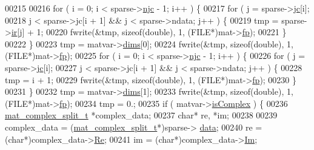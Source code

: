 \begin{DoxyCode}
{00215 
00216             \textcolor{keywordflow}{for} ( i = 0; i < sparse->\hyperlink{group___m_a_t_a482d8e4b40aa975f0c1daf146ebe08a4}{njc} - 1; i++ ) \{
00217                 \textcolor{keywordflow}{for} ( j = sparse->\hyperlink{group___m_a_t_ad1e74cdc4f7eff1e47a670297c01da4b}{jc}[i];
00218                       j < sparse->jc[i + 1] && j < sparse->ndata; j++ ) \{
00219                     tmp = sparse->\hyperlink{group___m_a_t_a8d4c863d704edddec5cbfa15b2d719c8}{ir}[j] + 1;
00220                     fwrite(&tmp, \textcolor{keyword}{sizeof}(\textcolor{keywordtype}{double}), 1, (FILE*)mat->\hyperlink{struct__mat__t_a85f562e407ca9ad4d2a6e14f839432b7}{fp});
00221                 \}
00222             \}
00223             tmp = matvar->\hyperlink{group___m_a_t_a8e01234e1c862ce3472bb37f5a09b92c}{dims}[0];
00224             fwrite(&tmp, \textcolor{keyword}{sizeof}(\textcolor{keywordtype}{double}), 1, (FILE*)mat->\hyperlink{struct__mat__t_a85f562e407ca9ad4d2a6e14f839432b7}{fp});
00225             \textcolor{keywordflow}{for} ( i = 0; i < sparse->\hyperlink{group___m_a_t_a482d8e4b40aa975f0c1daf146ebe08a4}{njc} - 1; i++ ) \{
00226                 \textcolor{keywordflow}{for} ( j = sparse->\hyperlink{group___m_a_t_ad1e74cdc4f7eff1e47a670297c01da4b}{jc}[i];
00227                       j < sparse->jc[i + 1] && j < sparse->ndata; j++ ) \{
00228                     tmp = i + 1;
00229                     fwrite(&tmp, \textcolor{keyword}{sizeof}(\textcolor{keywordtype}{double}), 1, (FILE*)mat->\hyperlink{struct__mat__t_a85f562e407ca9ad4d2a6e14f839432b7}{fp});
00230                 \}
00231             \}
00232             tmp = matvar->\hyperlink{group___m_a_t_a8e01234e1c862ce3472bb37f5a09b92c}{dims}[1];
00233             fwrite(&tmp, \textcolor{keyword}{sizeof}(\textcolor{keywordtype}{double}), 1, (FILE*)mat->\hyperlink{struct__mat__t_a85f562e407ca9ad4d2a6e14f839432b7}{fp});
00234             tmp = 0.;
00235             \textcolor{keywordflow}{if} ( matvar->\hyperlink{group___m_a_t_aeb03b3a69f108dc05470b00443a43739}{isComplex} ) \{
00236                 \hyperlink{group___m_a_t_structmat__complex__split__t}{mat\_complex\_split\_t} *complex\_data;
00237                 \textcolor{keywordtype}{char}* re, *im;
00238 
00239                 complex\_data = (\hyperlink{group___m_a_t_structmat__complex__split__t}{mat\_complex\_split\_t}*)sparse->
      \hyperlink{group___m_a_t_ae2c648cb9eac4ce47f26cddb44246152}{data};
00240                 re = (\textcolor{keywordtype}{char}*)complex\_data->\hyperlink{group___m_a_t_a484a93607508adac2bce53a0252e0325}{Re};
00241                 im = (\textcolor{keywordtype}{char}*)complex\_data->\hyperlink{group___m_a_t_a7182d10b0d3598415887376065440946}{Im};
}
\end{DoxyCode}
